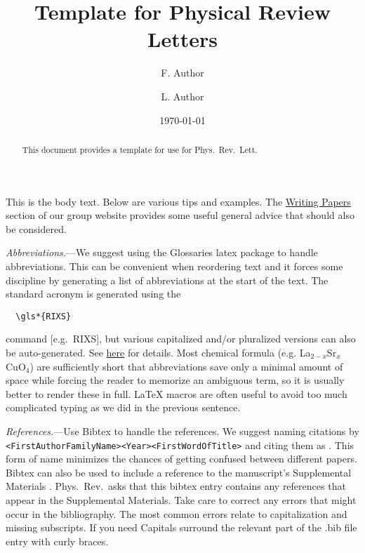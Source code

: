 \documentclass[aps,prl,showpacs,floatfix,twocolumn,superscriptaddress,longbibliography]{revtex4-2}
\def\LSCO{La$_{2-x}$Sr$_x$CuO$_4$}
\begin{document}
\title{Template for Physical Review Letters}

\author{F. Author}

\author{L. Author}


\date{\today}


\begin{abstract}
This document provides a template for use for Phys.\ Rev.\ Lett.
\end{abstract}

\maketitle

This is the body text. Below are various tips and examples. The
\href{https://markdean.info/groupnotes/writing/}{Writing Papers} section of our group website provides some useful general advice that should also be considered.

\textit{Abbreviations.}---We suggest using the Glossaries latex package to handle abbreviations. This can be convenient when reordering text and it forces some discipline by generating a list of abbreviations at the start of the text. The standard acronym is generated using the \begin{verbatim}  \gls*{RIXS}
\end{verbatim}
command [e.g.\ \gls*{RIXS}], but various capitalized and/or pluralized versions can also be auto-generated. See  \href{https://www.overleaf.com/learn/latex/Glossaries}{here} for details. Most chemical formula (e.g. \LSCO{}) are sufficiently short that abbreviations save only a minimal amount of space while forcing the reader to memorize an ambiguous term, so it is usually better to render these in full. \LaTeX{} macros are often useful to avoid too much complicated typing as we did in the previous sentence.

\textit{References.}---Use Bibtex to handle the references. We suggest naming citations by \texttt{<FirstAuthorFamilyName><Year><FirstWordOfTitle>}  and citing them as \cite{Anderson1973Resonating}. This form of name minimizes the chances of getting confused between different papers. Bibtex can also be used to include a reference to the manuscript's Supplemental Materials \cite{supp}. Phys.\ Rev.\ asks that this bibtex entry contains any references that appear in the Supplemental Materials. Take care to correct any errors that might occur in the bibliography. The most common errors relate to capitalization and missing subscripts. If you need {Capitals} surround the relevant part of the .bib file entry with curly braces.
\end{document}
